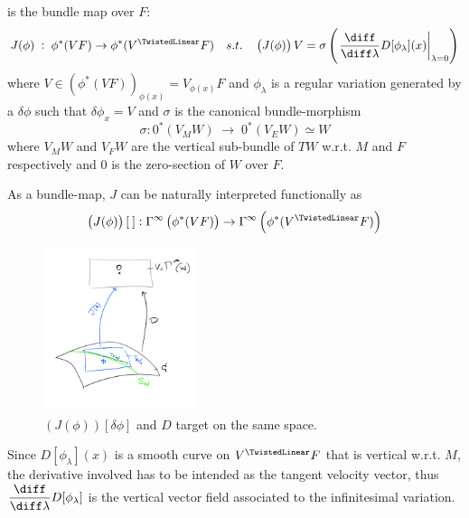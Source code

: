 \documentclass[a4paper,12pt,fleqn]{scrartcl}  %
\begin{document}
	\begin{definition}\label{Def:JacobiOp} is the bundle map over $F$:
		\begin{displaymath}
			J(\phi) \; : \; \phi^\ast(VF) \rightarrow	\phi^\ast(V^\TwistedLinear F) 
			\quad s.t. \quad  \left(J(\phi)\right) V
			= \sigma \left( \left.\dfrac{\diff}{\diff \lambda} D [\phi_\lambda](x) \right\rvert_{\lambda=0} \right)
		\end{displaymath}
		where $V\in (\phi^\ast(VF))_{\phi(x)} = V_{\phi(x)}F$ and $\phi_\lambda$ is a regular variation generated by a $\delta\phi$ such that $\delta\phi_x = V$ and
		$\sigma$ is the canonical bundle-morphism
		\begin{displaymath}
			\sigma:  0^\ast \left( V_M W \right)  \; \rightarrow \;  0^\ast \left(V_E W \right) \simeq W
		\end{displaymath}
		 where $V_M W$ and $V_F W$ are the vertical sub-bundle of $T W$ w.r.t. $M$ and $F$ respectively 
		 and $0$ is the zero-section of $W$ over $F$.
	\end{definition}
	As a bundle-map, $J$ can be naturally interpreted functionally as
	\begin{displaymath}
		\left(J(\phi)\right) [\: ] : 
		\Gamma^\infty\left(\phi^\ast(VF)\right) \rightarrow	
		\Gamma^\infty \left( 
		\phi^\ast(V^\TwistedLinear F)
		\right)
	\end{displaymath}
%
\begin{figure}
\centering
\includegraphics[width=0.40\textwidth]{Pictures/Jacobi.png}
\caption{\footnotesize \label{fig:jacobi}$ \left(J(\phi)\right) [ \delta\phi ]$ and $D$ target on the same space.}
\end{figure}
%
Since $D[\phi_\lambda](x)$ is a smooth curve on $ V^\TwistedLinear F $ that is vertical w.r.t. $M$, the derivative involved has to be intended as the tangent velocity vector, thus $\dfrac{\diff}{\diff \lambda} D [\phi_\lambda]$ is the vertical vector field associated to the infinitesimal variation.
\end{document}
